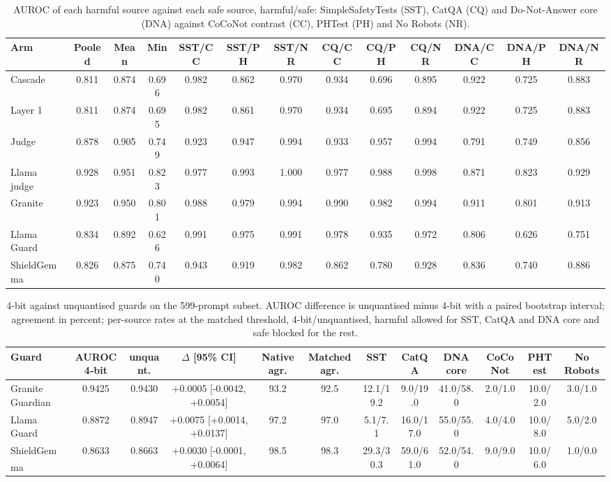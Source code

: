 \documentclass[journal]{IEEEtran}
\newcommand{\posthoc}{\textsuperscript{\dag}}
\begin{document}
\setcounter{table}{14}
\begin{table}[!htbp]
\caption{AUROC of each harmful source against each safe source, harmful/safe: SimpleSafetyTests (SST), CatQA (CQ) and Do-Not-Answer core (DNA) against CoCoNot contrast (CC), PHTest (PH) and No Robots (NR).}
\label{abr:tab:pairwise}
\centering
\scriptsize
\setlength{\tabcolsep}{3pt}
\begin{tabular}{@{}lcccccccccccc@{}}
\toprule
Arm & Pooled & Mean & Min & SST/CC & SST/PH & SST/NR & CQ/CC & CQ/PH & CQ/NR & DNA/CC & DNA/PH & DNA/NR \\
\midrule
Cascade & 0.811 & 0.874 & 0.696 & 0.982 & 0.862 & 0.970 & 0.934 & 0.696 & 0.895 & 0.922 & 0.725 & 0.883 \\
Layer 1 & 0.811 & 0.874 & 0.695 & 0.982 & 0.861 & 0.970 & 0.934 & 0.695 & 0.894 & 0.922 & 0.725 & 0.883 \\
Judge & 0.878 & 0.905 & 0.749 & 0.923 & 0.947 & 0.994 & 0.933 & 0.957 & 0.994 & 0.791 & 0.749 & 0.856 \\
Llama judge & 0.928 & 0.951 & 0.823 & 0.977 & 0.993 & 1.000 & 0.977 & 0.988 & 0.998 & 0.871 & 0.823 & 0.929 \\
Granite & 0.923 & 0.950 & 0.801 & 0.988 & 0.979 & 0.994 & 0.990 & 0.982 & 0.994 & 0.911 & 0.801 & 0.913 \\
Llama Guard & 0.834 & 0.892 & 0.626 & 0.991 & 0.975 & 0.991 & 0.978 & 0.935 & 0.972 & 0.806 & 0.626 & 0.751 \\
ShieldGemma & 0.826 & 0.875 & 0.740 & 0.943 & 0.919 & 0.982 & 0.862 & 0.780 & 0.928 & 0.836 & 0.740 & 0.886 \\
\bottomrule
\end{tabular}
\end{table}

\setcounter{table}{15}
\begin{table}[!htbp]
\caption{4-bit against unquantised guards on the 599-prompt subset. AUROC difference is unquantised minus 4-bit with a paired bootstrap interval; agreement in percent; per-source rates at the matched threshold, 4-bit/unquantised, harmful allowed for SST, CatQA and DNA core and safe blocked for the rest.}
\label{abr:tab:quant}
\centering
\scriptsize
\setlength{\tabcolsep}{3pt}
\begin{tabular}{@{}lccccccccccc@{}}
\toprule
Guard & AUROC 4-bit & unquant. & $\Delta$ [95\% CI] & Native agr. & Matched agr. & SST & CatQA & DNA core & CoCoNot & PHTest & No Robots \\
\midrule
Granite Guardian & 0.9425 & 0.9430 & +0.0005 [-0.0042, +0.0054] & 93.2 & 92.5 & 12.1/19.2 & 9.0/19.0 & 41.0/58.0 & 2.0/1.0 & 10.0/2.0 & 3.0/1.0 \\
Llama Guard & 0.8872 & 0.8947 & +0.0075 [+0.0014, +0.0137] & 97.2 & 97.0 & 5.1/7.1 & 16.0/17.0 & 55.0/55.0 & 4.0/4.0 & 10.0/8.0 & 5.0/2.0 \\
ShieldGemma\posthoc & 0.8633 & 0.8663 & +0.0030 [-0.0001, +0.0064] & 98.5 & 98.3 & 29.3/30.3 & 59.0/61.0 & 52.0/54.0 & 9.0/9.0 & 10.0/6.0 & 1.0/0.0 \\
\bottomrule
\end{tabular}
\end{table}
\end{document}
